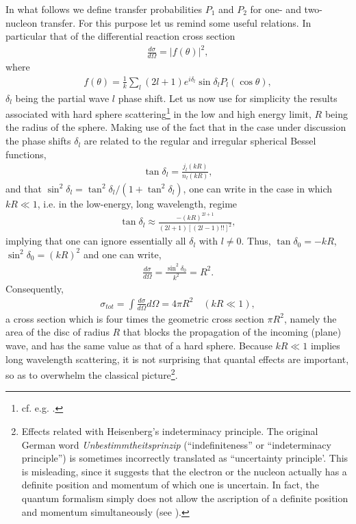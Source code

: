 In what follows we define transfer probabilities $P_{1}$ and $P_{2}$ for one- and two-nucleon transfer. For this purpose let us remind some useful relations. In particular that of the differential reaction cross section 
\begin{align}
\frac{d\sigma}{d\Omega}=|f(\theta)|^2,
\end{align}
where
\begin{align}
f(\theta)=\frac{1}{k}\sum_l(2l+1)e^{i\delta_l}\sin\delta_lP_l(\cos\theta),
\end{align}
$\delta_l$ being the partial wave $l$ phase shift. Let us now use for simplicity the results associated with hard sphere scattering\footnote{cf. e.g. \cite{Sakurai:94}.} in the low and high energy limit, $R$ being the radius of the sphere. Making use of the fact that in the case under discussion the phase shifts $\delta_l$ are related to the regular and irregular spherical Bessel functions,
\begin{align}\label{eq3.2.8}
\tan\delta_l=\frac{j_l(kR)}{n_l(kR)},
\end{align}
and that $\sin^2\delta_l=\tan^2\delta_l/(1+\tan^2\delta_l)$,  one can write in the case in which $kR\ll1$, i.e. in the low-energy, long wavelength, regime
\begin{align}
\tan\delta_l\approx\frac{-(kR)^{2l+1}}{(2l+1)[(2l-1)!!]^2},
\end{align}
implying that one can ignore essentially all $\delta_l$ with $l\neq0$. Thus, $\tan\delta_0=-k R$, $\sin^2\delta_0=(kR)^2$ and one can write,
\begin{align}
\frac{d\sigma}{d\Omega}=\frac{\sin^2\delta_0}{k^2}=R^2.
\end{align}
Consequently,
\begin{align}
\sigma_{tot}=\int\frac{d\sigma}{d\Omega}d\Omega=4\pi R^2\quad(kR\ll1),
\end{align}
a cross section which is four times the geometric cross section $\pi R^2$, namely the area of the disc of radius $R$ that blocks the propagation of the incoming (plane) wave, and has the same value as that of a hard sphere. Because $kR\ll1$  
implies long wavelength scattering, it is not surprising that quantal effects are important, so as to overwhelm the classical picture\footnote{Effects related with Heisenberg's indeterminacy principle. The original German word \textit{Unbestimmtheitsprinzip} (``indefiniteness'' or ``indeterminacy principle'') is sometimes incorrectly translated as ``uncertainty principle'. This is  misleading, since it suggests that the electron or the nucleon actually has a definite position and momentum of which one is uncertain. In fact, the quantum formalism simply does not allow the ascription of a definite position and momentum simultaneously (see \cite{Leggett:87}).}. 


